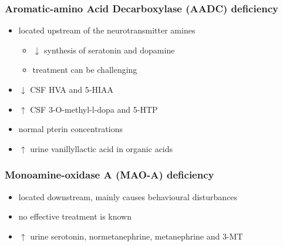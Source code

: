 \documentclass[12pt]{scrartcl}
\begin{document}
\subsubsection{Aromatic-amino Acid Decarboxylase (AADC) deficiency}
\label{sec:org7e43a32}
\begin{itemize}
\item located upstream of the neurotransmitter amines
\begin{itemize}
\item \(\downarrow\) synthesis of seratonin and dopamine
\item treatment can be challenging
\end{itemize}
\item \(\downarrow\) CSF HVA and 5-HIAA
\item \(\uparrow\) CSF 3-O-methyl-l-dopa and 5-HTP
\item normal pterin concentrations
\item \(\uparrow\) urine vanillyllactic acid in organic acids
\end{itemize}
\subsubsection{Monoamine-oxidase A (MAO-A) deficiency}
\label{sec:org9d02989}
\begin{itemize}
\item located downstream, mainly causes behavioural disturbances
\item no effective treatment is known
\item \(\uparrow\) urine serotonin, normetanephrine, metanephrine and 3-MT
\end{itemize}
\end{document}
